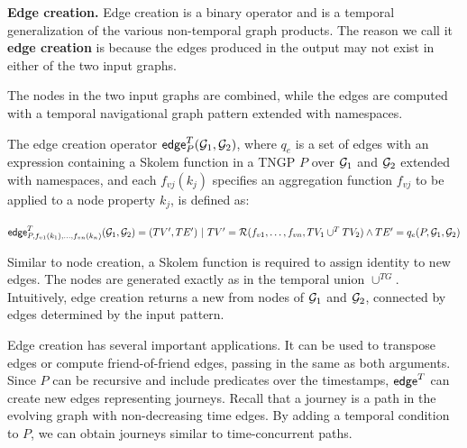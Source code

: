 {\bf Edge creation.}  Edge creation is a binary operator and is a
temporal generalization of the various non-temporal graph products.
The reason we call it {\bf edge creation} is because the edges
produced in the output may not exist in either of the two input
graphs.

The nodes in the two input graphs are combined, while the edges are
computed with a temporal navigational graph pattern extended with
namespaces.

\begin{definition}
\label{def:edgecr}
The edge creation operator $\textsf{edge}^T_{P}(\mathcal{G}_1,\mathcal{G}_2)$, where
$q_e$ is a set of edges with an expression containing a Skolem
function in a TNGP $P$ over $\mathcal{G}_1$ and $\mathcal{G}_2$ extended with
namespaces, and each $f_{vj}(k_j)$ specifies an aggregation function
$f_{vj}$ to be applied to a node property $k_j$, is defined as:

$\textsf{edge}^T_{P,f_{v1}(k_1),\ldots,f_{vn}(k_n)}(\ttt_1,\ttt_2) = (TV',TE') ~|~ \break TV' = \resolve{f_{v1},\ldots,f_{vn}}{TV_1 \cup^T TV_2} \land TE' = q_e(P,\ttt_1,\ttt_2)$
\end{definition}

Similar to node creation, a Skolem function is required to assign
identity to new edges.  The nodes are generated exactly as in the
temporal union $\cup^{TG}$.  Intuitively, edge creation returns a
new \tg from nodes of $\mathcal{G}_1$ and $\mathcal{G}_2$, connected by edges
determined by the input pattern.

Edge creation has several important applications.  It can be used to
transpose \tg edges or compute friend-of-friend edges, passing in the
same \tg as both arguments.  Since $P$ can be recursive and include
predicates over the timestamps, $\textsf{edge}^T$ can create new edges
representing journeys.  Recall that a journey is a path in the
evolving graph with non-decreasing time edges.  By adding a temporal
condition to $P$, we can obtain journeys similar to time-concurrent
paths.



